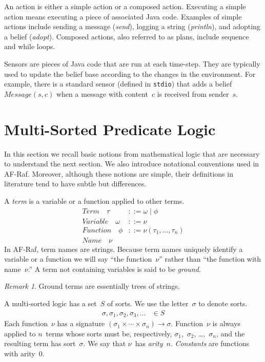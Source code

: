 \documentclass{aamas2012} %
\theoremstyle{remark}
\newtheorem{remark}{Remark}
\begin{document}
An action is either a simple action or a composed action. Executing a
simple action means executing a piece of associated Java code. Examples of
simple actions include sending a message (\textit{send}), logging a string
(\textit{println}), and adopting a belief (\textit{adopt}).  Composed
actions, also referred to as plans, include sequence and while loops.

Sensors are pieces of Java code that are run at each time-step. They are
typically used to update the belief base according to the changes in the
environment. For example, there is a standard sensor (defined in
\texttt{stdio}) that adds a belief $\mathit{Message}(s,c)$ when a message
with content~$c$ is received from sender~$s$.

\section{Multi-Sorted Predicate Logic} \label{sec:multi-sorted} %

In this section we recall basic notions from mathematical logic that are
necessary to understand the next section. We also introduce notational
conventions used in AF-Raf. Moreover, although these notions are simple,
their definitions in literature tend to have subtle but differences.

A \emph{term} is a variable or a function applied to other terms.
\begin{align}
\mathit{Term}\quad\tau &::= \omega \mid \phi \\
\mathit{Variable}\quad\omega &::= \nu \\
\mathit{Function}\quad\phi &::= \nu(\tau_1,\ldots,\tau_n) \\
\mathit{Name}\quad\nu
\end{align}
In AF-Raf, term names are strings.  Because term names uniquely identify a
variable or a function we will say ``the function~$\nu$'' rather than ``the
function with name~$\nu$.'' A term not containing variables is said to be
\emph{ground}.

\begin{remark}
Ground terms are essentially trees of strings.
\end{remark}

A multi-sorted logic has a set~$S$ of sorts.  We use the letter~$\sigma$ to
denote sorts.
\begin{align}
\sigma, \sigma_1, \sigma_2, \sigma_3, \ldots &\in S
\end{align}
Each function~$\nu$ has a signature
$(\sigma_1\times\cdots\times\sigma_n)\to\sigma$.  Function~$\nu$ is always
applied to $n$~terms whose sorts must be, respectively,
$\sigma_1$,~$\sigma_2$, \dots,~$\sigma_n$, and the resulting term has
sort~$\sigma$. We say that $\nu$~has \emph{arity}~$n$. \emph{Constants} are
functions with arity~$0$.
\end{document}
